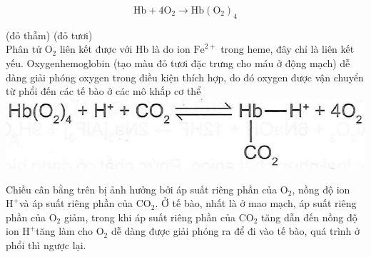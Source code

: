 \documentclass[10pt]{article}
\begin{document}
$$
\mathrm{Hb}+4 \mathrm{O}_{2} \rightarrow \mathrm{Hb}\left(\mathrm{O}_{2}\right)_{4}
$$

(đỏ thẫm) (đỏ tươi)\\
Phân tử $\mathrm{O}_{2}$ liên kết được với Hb là do ion $\mathrm{Fe}^{2+}$ trong heme, đây chỉ là liên kết yếu. Oxygenhemoglobin (tạo màu đỏ tươi đặc trưng cho máu ở động mạch) dễ dàng giải phóng oxygen trong điều kiện thích hợp, do đó oxygen được vận chuyển từ phổi đến các tế bào ở các mô khắp cơ thể\\
\includegraphics[max width=\textwidth, center]{2025_10_23_b4e16b74380d0f7e7700g-123(3)}

Chiều cân bằng trên bị ảnh hưởng bởi áp suất riêng phần của $\mathrm{O}_{2}$, nồng độ ion $\mathrm{H}^{+}$và áp suất riêng phần của $\mathrm{CO}_{2}$. Ở tế bào, nhất là ở mao mạch, áp suất riêng phần của $\mathrm{O}_{2}$ giảm, trong khi áp suất riêng phần của $\mathrm{CO}_{2}$ tăng dẫn đến nồng độ ion $\mathrm{H}^{+}$tăng làm cho $\mathrm{O}_{2}$ dễ dàng được giải phóng ra để đi vào tế bào, quá trình ở phổi thì ngược lại.
\end{document}

